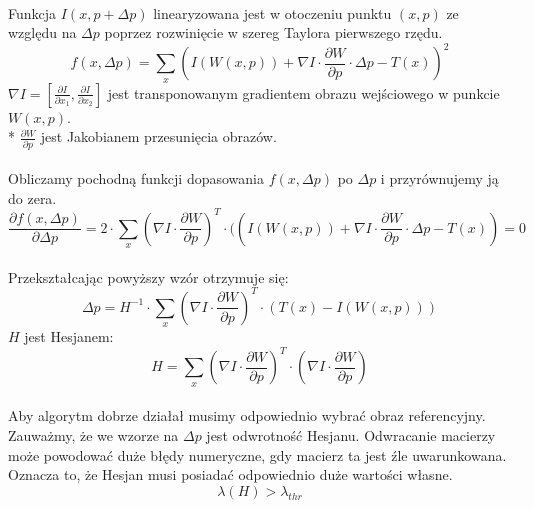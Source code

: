 \paragraph*{}
Funkcja \(I(x,p+\Delta p)\) linearyzowana jest w otoczeniu punktu \((x,p)\) ze względu na \(\Delta p\) poprzez rozwinięcie w szereg Taylora pierwszego rzędu.
\begin{equation}
f(x,\Delta p)=\sum\limits_{x}(I(W(x,p))+\nabla I \cdot \frac{\partial W}{\partial p} \cdot \Delta p-T(x))^2
\end{equation}
\(\nabla I=[\frac{\partial I}{\partial x_1}, \frac{\partial I}{\partial x_2}]\) jest transponowanym gradientem obrazu wejściowego w punkcie \(W(x,p)\).\\*
\(\frac{\partial W}{\partial p}\) jest Jakobianem przesunięcia obrazów.
\paragraph*{}
Obliczamy pochodną funkcji dopasowania \(f(x,\Delta p)\) po \(\Delta p\) i przyrównujemy ją do zera.
\begin{equation}
\frac{\partial f(x,\Delta p)}{\partial \Delta p}=2 \cdot \sum\limits_{x} (\nabla I \cdot \frac{\partial W}{\partial p})^T \cdot ((I(W(x,p))+\nabla I \cdot \frac{\partial W}{\partial p} \cdot \Delta p-T(x))=0
\end{equation}
\paragraph*{}
Przekształcając powyższy wzór otrzymuje się:
\begin{equation}
\label{eq:dp_klt}
\Delta p=H^{-1} \cdot \sum\limits_{x}(\nabla I \cdot \frac{\partial W}{\partial p})^T \cdot (T(x)-I(W(x,p)))
\end{equation}
\(H\) jest Hesjanem:
\begin{equation}
H=\sum\limits_{x}(\nabla I \cdot \frac{\partial W}{\partial p})^T \cdot (\nabla I \cdot \frac{\partial W}{\partial p})
\end{equation}
\paragraph*{}
Aby algorytm dobrze działał musimy odpowiednio wybrać obraz referencyjny. Zauważmy, że we wzorze na \(\Delta p\) jest odwrotność Hesjanu. Odwracanie macierzy może powodować duże błędy numeryczne, gdy macierz ta jest źle uwarunkowana. Oznacza to, że Hesjan musi posiadać odpowiednio duże wartości własne.
\begin{equation}
\lambda(H)>\lambda_{thr}
\end{equation}
